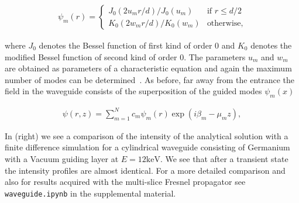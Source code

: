 \begin{align*}
    \psi_m(r) = 
    \begin{cases}
    J_0(2 u_m r /d)/J_0(u_m) & \text{if } r \le d/2\\
    K_0(2 w_m r /d)/K_0(w_m) & \text{otherwise,}
    \end{cases}
\end{align*}

where $J_0$ denotes the Bessel function of first kind of order 0 and $K_0$ denotes the modified Bessel function of second kind of order 0. The parameters $u_m$ and $w_m$ are obtained as parameters of a characteristic equation and again the maximum number of modes can be determined~\cite{DissertationFuhse}. As before, far away from the entrance the field in the waveguide consists of the superposition of the guided modes $\psi_m(x)$

\begin{align*}
    \psi(r,z) = \sum_{m=1}^{N} c_m \psi_m(r) \exp( i \beta_m - \mu_m z),
\end{align*}


In  (right) we see a comparison of the intensity of the analytical solution with a finite difference simulation for a cylindrical waveguide consisting of Germanium with a Vacuum guiding layer at $E = 12\text{keV}$. We see that after a transient state the intensity profiles are almost identical. For a more detailed comparison and also for results acquired with the multi-slice Fresnel propagator see \lstinline{waveguide.ipynb} in the supplemental material.




